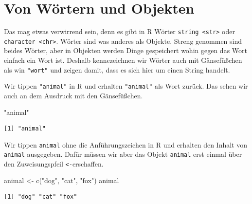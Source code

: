 \documentclass[
  letterpaper,
  DIV=11,
  oneside]{scrreport}
\newenvironment{Shaded}{\begin{snugshade}}{\end{snugshade}}
\newcommand{\FunctionTok}[1]{\textcolor[rgb]{0.28,0.35,0.67}{#1}}
\newcommand{\NormalTok}[1]{\textcolor[rgb]{0.00,0.23,0.31}{#1}}
\newcommand{\OtherTok}[1]{\textcolor[rgb]{0.00,0.23,0.31}{#1}}
\newcommand{\StringTok}[1]{\textcolor[rgb]{0.13,0.47,0.30}{#1}}
\begin{document}
\hypertarget{von-wuxf6rtern-und-objekten}{%
\section{Von Wörtern und Objekten}\label{von-wuxf6rtern-und-objekten}}

Das mag etwas verwirrend sein, denn es gibt in R Wörter
\texttt{string\ \textless{}str\textgreater{}} oder
\texttt{character\ \textless{}chr\textgreater{}}. Wörter sind was
anderes als Objekte. Streng genommen sind beides Wörter, aber in
Objekten werden Dinge gespeichert wohin gegen das Wort einfach ein Wort
ist. Deshalb kennezeichnen wir Wörter auch mit Gänsefüßchen als win
\texttt{"wort"} und zeigen damit, dass es sich hier um einen String
handelt.

Wir tippen \texttt{"animal"} in R und erhalten \texttt{"animal"} als
Wort zurück. Das sehen wir auch an dem Ausdruck mit den Gänsefüßchen.

\begin{Shaded}
\begin{Highlighting}[]
\StringTok{"animal"}
\end{Highlighting}
\end{Shaded}

\begin{verbatim}
[1] "animal"
\end{verbatim}

{}

Wir tippen \texttt{animal} ohne die Anführungszeichen in R und erhalten
den Inhalt von \texttt{animal} ausgegeben. Dafür müssen wir aber das
Objekt \texttt{animal} erst einmal über den Zuweisungspfeil
\texttt{\textless{}-}erschaffen.

\begin{Shaded}
\begin{Highlighting}[]
\NormalTok{animal }\OtherTok{\textless{}{-}} \FunctionTok{c}\NormalTok{(}\StringTok{"dog"}\NormalTok{, }\StringTok{"cat"}\NormalTok{, }\StringTok{"fox"}\NormalTok{)}
\NormalTok{animal}
\end{Highlighting}
\end{Shaded}

\begin{verbatim}
[1] "dog" "cat" "fox"
\end{verbatim}
\end{document}
